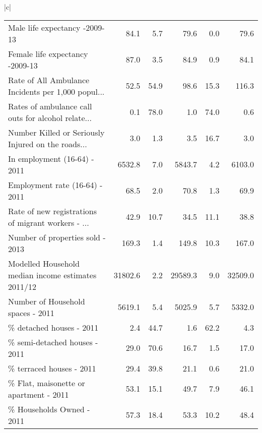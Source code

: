 \documentclass[conference]{IEEEtran}
\begin{document}
\begin{figure*}[ht!]
{\begin{tabular}{|c|}
\begin{table*}[t]
\begin{tabular}{lrrrrr}
Male life expectancy -2009-13                      &           84.1 &        5.7 &           79.6 &        0.0 &    79.6 \\
Female life expectancy -2009-13                    &           87.0 &        3.5 &           84.9 &        0.9 &    84.1 \\
Rate of All Ambulance Incidents per 1,000 popul... &           52.5 &       54.9 &           98.6 &       15.3 &   116.3 \\
Rates of ambulance call outs for alcohol relate... &            0.1 &       78.0 &            1.0 &       74.0 &     0.6 \\
Number Killed or Seriously Injured on the roads... &            3.0 &        1.3 &            3.5 &       16.7 &     3.0 \\
In employment (16-64) - 2011                       &         6532.8 &        7.0 &         5843.7 &        4.2 &  6103.0 \\
Employment rate (16-64) - 2011                     &           68.5 &        2.0 &           70.8 &        1.3 &    69.9 \\
Rate of new registrations of migrant workers - ... &           42.9 &       10.7 &           34.5 &       11.1 &    38.8 \\
Number of properties sold - 2013                   &          169.3 &        1.4 &          149.8 &       10.3 &   167.0 \\
Modelled Household median income estimates 2011/12 &        31802.6 &        2.2 &        29589.3 &        9.0 & 32509.0 \\
Number of Household spaces - 2011                  &         5619.1 &        5.4 &         5025.9 &        5.7 &  5332.0 \\
\% detached houses - 2011                           &            2.4 &       44.7 &            1.6 &       62.2 &     4.3 \\
\% semi-detached houses - 2011                      &           29.0 &       70.6 &           16.7 &        1.5 &    17.0 \\
\% terraced houses - 2011                           &           29.4 &       39.8 &           21.1 &        0.6 &    21.0 \\
\% Flat, maisonette or apartment - 2011             &           53.1 &       15.1 &           49.7 &        7.9 &    46.1 \\
\% Households Owned - 2011                          &           57.3 &       18.4 &           53.3 &       10.2 &    48.4 \\

\end{tabular}
\end{table*}
\end{tabular}}
\end{figure*}
\end{document}

